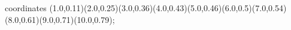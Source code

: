 					coordinates { (1.0,0.11)(2.0,0.25)(3.0,0.36)(4.0,0.43)(5.0,0.46)(6.0,0.5)(7.0,0.54)(8.0,0.61)(9.0,0.71)(10.0,0.79)};
